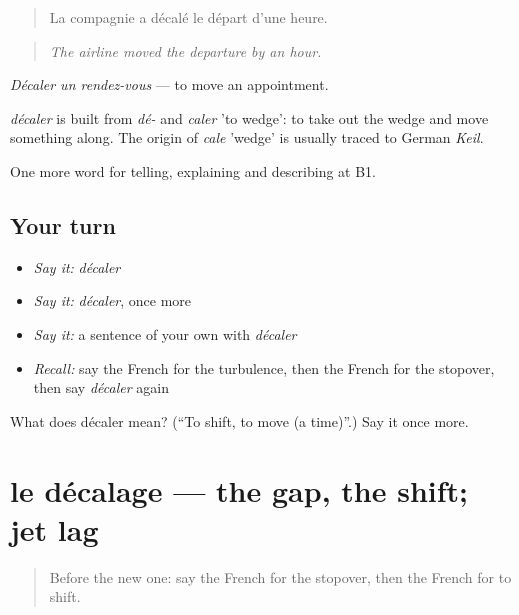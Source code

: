 \begin{quote}
La compagnie a décalé le départ d'une heure.
\end{quote}

\begin{quote}
\emph{The airline moved the departure by an hour.}
\end{quote}

\emph{Décaler un rendez-vous} — to move an appointment.

\begin{cousinweb}
\emph{décaler} is built from \emph{dé-} and \emph{caler} 'to wedge': to take out the wedge and move something along. The origin of \emph{cale} 'wedge' is usually traced to German \emph{Keil}.
\end{cousinweb}

\begin{grammarlens}[title={What you've built}]
One more word for telling, explaining and describing at B1.
\end{grammarlens}

\subsection*{Your turn}
\begin{itemize}
\raggedright
  \item \emph{Say it:} \emph{décaler}
  \item \emph{Say it:} \emph{décaler}, once more
  \item \emph{Say it:} a sentence of your own with \emph{décaler}
  \item \emph{Recall:} say the French for the turbulence, then the French for the stopover, then say \emph{décaler} again
\end{itemize}

\begin{tcolorbox}[breakable,colback=teal!4,colframe=teal!35!black,title={Before you move on}]
What does décaler mean? (\textquotedblleft{}To shift, to move (a time)\textquotedblright{}.) Say it once more.
\end{tcolorbox}
\section[le décalage]{le décalage — the gap, the shift; jet lag}

\label{lesson:FR-C420-decalage}



\begin{quote}
Before the new one: say the French for the stopover, then the French for to shift.
\end{quote}


